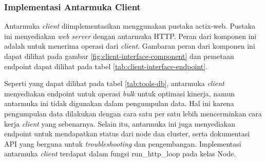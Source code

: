 \subsubsection{Implementasi Antarmuka Client}
\label{subsubsection:implementasi-antarmuka-client}

Antarmuka \textit{client} diimplementasikan menggunakan pustaka actix-web. Pustaka ini menyediakan \textit{web server} dengan antarmuka HTTP. Peran dari komponen ini adalah untuk menerima operasi dari \textit{client}. Gambaran peran dari komponen ini dapat dilihat pada gambar \ref{fig:client-interface-component} dan pemetaan endpoint dapat dilihat pada tabel \ref{tab:client-interface-endpoint}.

\begin{table}[h]
    \centering
    \caption{Endpoint dari Antarmuka Client}
    \label{tab:tools-db}
\end{table}

Seperti yang dapat dilihat pada tabel \ref{tab:tools-db}, antarmuka \textit{client} menyediakan endpoint untuk operasi \textit{bulk} untuk optimasi kinerja, namun antarmuka ini tidak digunakan dalam pengumpulan data. Hal ini karena pengumpulan data dilakukan dengan cara satu per satu lebih mencerminkan cara kerja \textit{client} yang sebenarnya. Selain itu, antarmuka ini juga menyediakan endpoint untuk mendapatkan status dari node dan cluster, serta dokumentasi API yang berguna untuk \textit{troubleshooting} dan pengembangan. Implementasi antarmuka \textit{client} terdapat dalam fungsi run\_http\_loop pada kelas Node.
